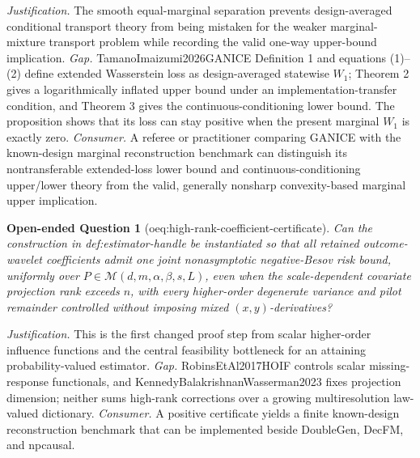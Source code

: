 \documentclass{article}
\newtheorem{openendedquestion}{Open-ended Question}
\begin{document}
\par\smallskip\noindent \textit{Justification.} The smooth equal-marginal separation prevents design-averaged conditional transport theory from being mistaken for the weaker marginal-mixture transport problem while recording the valid one-way upper-bound implication. \textit{Gap.} TamanoImaizumi2026GANICE Definition 1 and equations (1)--(2) define extended Wasserstein loss as design-averaged statewise \(W_1\); Theorem 2 gives a logarithmically inflated upper bound under an implementation-transfer condition, and Theorem 3 gives the continuous-conditioning lower bound. The proposition shows that its loss can stay positive when the present marginal \(W_1\) is exactly zero. \textit{Consumer.} A referee or practitioner comparing GANICE with the known-design marginal reconstruction benchmark can distinguish its nontransferable extended-loss lower bound and continuous-conditioning upper/lower theory from the valid, generally nonsharp convexity-based marginal upper implication.

\begin{openendedquestion}[oeq:high-rank-coefficient-certificate]\label{oeq:high-rank-coefficient-certificate}
Can the construction in def:estimator-handle be instantiated so that all retained outcome-wavelet coefficients admit one joint nonasymptotic negative-Besov risk bound, uniformly over \(P\in\mathcal M(d,m,\alpha,\beta,s,L)\), even when the scale-dependent covariate projection rank exceeds \(n\), with every higher-order degenerate variance and pilot remainder controlled without imposing mixed \((x,y)\)-derivatives?
\end{openendedquestion}
\par\smallskip\noindent \textit{Justification.} This is the first changed proof step from scalar higher-order influence functions and the central feasibility bottleneck for an attaining probability-valued estimator. \textit{Gap.} RobinsEtAl2017HOIF controls scalar missing-response functionals, and KennedyBalakrishnanWasserman2023 fixes projection dimension; neither sums high-rank corrections over a growing multiresolution law-valued dictionary. \textit{Consumer.} A positive certificate yields a finite known-design reconstruction benchmark that can be implemented beside DoubleGen, DecFM, and npcausal.
\end{document}
